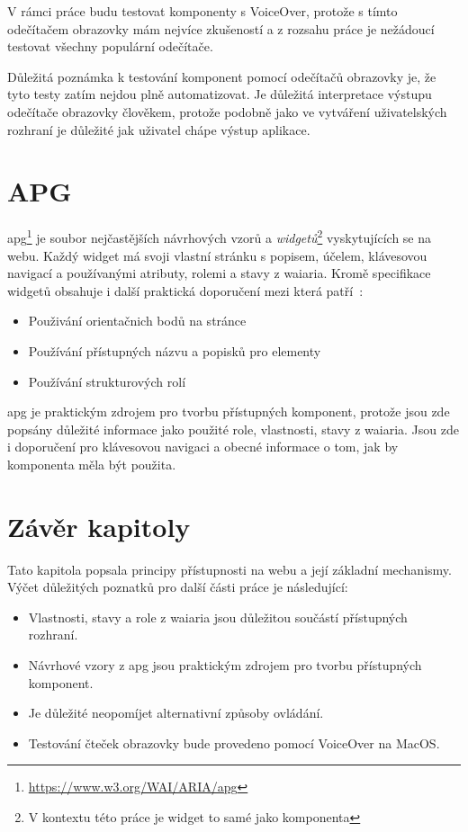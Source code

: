 V rámci práce budu testovat komponenty s VoiceOver, protože s tímto odečítačem obrazovky mám nejvíce zkušeností a z rozsahu práce je nežádoucí testovat všechny populární odečítače.

Důležitá poznámka k testování komponent pomocí odečítačů obrazovky je, že tyto testy zatím nejdou plně automatizovat.
Je důležitá interpretace výstupu odečítače obrazovky člověkem, protože podobně jako ve vytváření uživatelských rozhraní je důležité jak uživatel chápe výstup aplikace.

\section{APG}

\gls{apg}\footnote{\url{https://www.w3.org/WAI/ARIA/apg}} je soubor nejčastějších návrhových vzorů a \textit{widgetů}\footnote{V kontextu této práce je widget to samé jako komponenta} vyskytujících se na webu.
Každý widget má svoji vlastní stránku s popisem, účelem, klávesovou navigací a používanými atributy, rolemi a stavy z \gls{waiaria}.
Kromě specifikace widgetů obsahuje i další praktická doporučení mezi která patří~\cite{apg}:

\begin{itemize}
  \item Použivání orientačnich bodů na stránce
  \item Používání přístupných názvu a popisků pro elementy
  \item Používání strukturových rolí
\end{itemize}

\gls{apg} je praktickým zdrojem pro tvorbu přístupných komponent, protože jsou zde popsány důležité informace jako použité role, vlastnosti, stavy z \gls{waiaria}.
Jsou zde i doporučení pro klávesovou navigaci a obecné informace o tom, jak by komponenta měla být použita.

\section{Závěr kapitoly}

Tato kapitola popsala principy přístupnosti na webu a její základní mechanismy.
Výčet důležitých poznatků pro další části práce je následující:

\begin{itemize}
  \item Vlastnosti, stavy a role z \gls{waiaria} jsou důležitou součástí přístupných rozhraní.
  \item Návrhové vzory z \gls{apg} jsou praktickým zdrojem pro tvorbu přístupných komponent.
  \item Je důležité neopomíjet alternativní způsoby ovládání.
  \item Testování čteček obrazovky bude provedeno pomocí VoiceOver na MacOS.
\end{itemize}
